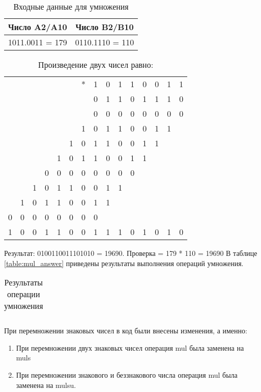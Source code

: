\documentclass{bmstu}
\begin{document}
\begin{table}[h]
\caption{Входные данные для умножения}
	\label{table:mul_table_ex}
	\begin{tabular}{|c|c|}
	\hline
		Число A2/A10 & Число B2/B10 \\
	\hline
		1011.0011 = 179 & 0110.1110 = 110 \\
	\hline
	\end{tabular}
\end{table}


\begin{table}[h]
\caption{Произведение двух чисел равно:}
	\label{table:mul_table}
	\begin{tabular}{|ccccccccccccccc|}
	\hline
		&&&&&&*&1&0&1&1&0&0&1&1\\
		&&&&&&&0&1&1&0&1&1&1&0\\
	\cline{8-15}
		&&&&&&&0&0&0&0&0&0&0&0\\
		&&&&&&1&0&1&1&0&0&1&1&\\
		&&&&&1&0&1&1&0&0&1&1&&\\
		&&&&1&0&1&1&0&0&1&1&&&\\
		&&&0&0&0&0&0&0&0&0&&&&\\
		&&1&0&1&1&0&0&1&1&&&&&\\
		&1&0&1&1&0&0&1&1&&&&&&\\
		0&0&0&0&0&0&0&0&&&&&&&\\
	\hline
		1&0&0&1&1&0&0&1&1&1&0&1&0&1&0\\
	\hline
	\end{tabular}
\end{table}

Результат: 0100110011101010 = 19690. Проверка = 179 * 110 = 19690 \newline
В таблице \ref{table:mul_answer} приведены результаты выполнения операций умножения.

\begin{table}[h]
\caption{Результаты операции умножения}
	\label{table:mul_table}
	\begin{tabular}{|ccccccccccccccc|}
	\hline
	\hline
	\end{tabular}
\end{table}

При перемножении знаковых чисел в код были внесены изменения, а именно:
\begin{enumerate}
\item При перемножении двух знаковых чисел операция mul была заменена на muls
\item При перемножении знакового и беззнакового числа операция mul была заменена на mulsu.
\end{enumerate}
\end{document}

